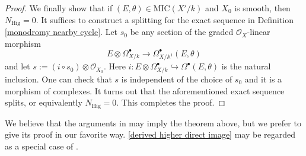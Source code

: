 \documentclass[12pt, a4paper]{article}
\begin{document}
\begin{proof}
We finally show that if $(E,\theta)\in\mathrm{MIC}(X'/k)$ and $X_0$ is smooth, then $N_\mathrm{Hig}=0$. It suffices to construct a splitting for the exact sequence in Definition \ref{monodromy nearby cycle}. Let $s_0$ be any section of the graded $\mathcal O_X$-linear morphism 
$$E\otimes\Omega^\bullet_{X/k}\to\Omega_{X/\mathbb A^1}^\bullet(E,\theta)$$
and let $s:=(i\circ s_0)\otimes\mathcal O_{X_0}$. Here $i:E\otimes\Omega^\bullet_{X/k}\hookrightarrow\Omega^\bullet(E,\theta)$ is the natural inclusion. One can check that $s$ is independent of the choice of $s_0$ and it is a morphism of complexes. It turns out that the aforementioned exact sequence splits, or equivalently $N_\mathrm{Hig}=0$. This completes the proof.
\end{proof}
We believe that the arguments in \cite[\S3.1-3.2]{OV} may imply the theorem above, but  we prefer to give its proof in our favorite way. \eqref{derived higher direct image} may be regarded as a special case of \cite[Theorem 3.8]{OV}.





\fi
\end{document}
